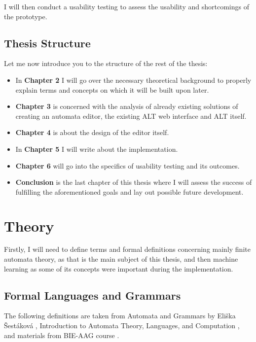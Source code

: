 I will then conduct a usability testing to assess the usability and shortcomings of the prototype.

\section{Thesis Structure}

Let me now introduce you to the structure of the rest of the thesis:

\begin{itemize}
\item In \textbf{Chapter 2} I will go over the necessary theoretical background to properly explain terms and concepts on which it will be built upon later.

\item \textbf{Chapter 3} is concerned with the analysis of already existing solutions of creating an automata editor, the existing ALT web interface and ALT itself.

\item \textbf{Chapter 4} is about the design of the editor itself.

\item In \textbf{Chapter 5} I will write about the implementation.

\item \textbf{Chapter 6} will go into the specifics of usability testing and its outcomes.

\item \textbf{Conclusion} is the last chapter of this thesis where I will assess the success of fulfilling the aforementioned goals and lay out possible future development.

\end{itemize}

\chapter{Theory}
\label{chap:theory}

Firstly,  I will need to define terms and formal definitions concerning mainly finite automata theory, as that is the main subject of this thesis, and then machine learning as some of its concepts were important during the implementation. 

\section{Formal Languages and Grammars}
 
The following definitions are taken from Automata and Grammars by Eliška Šestáková \cite{automata-and-grammars}, Introduction to Automata Theory, Languages, and Computation \cite{introduction-automata}, and materials from BIE-AAG course \cite{lectures}.

